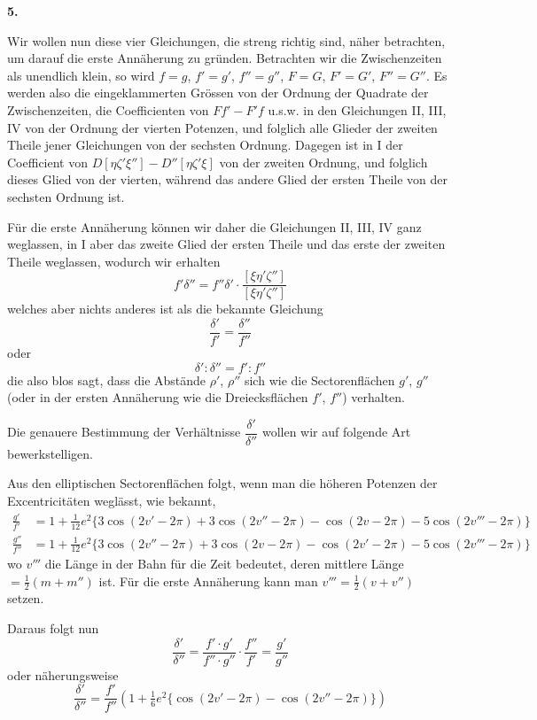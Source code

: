 \documentclass[10pt,a4paper]{article}
\begin{document}
\medskip
\noindent
\textbf{5.}

\medskip
\noindent
Wir wollen nun diese vier Gleichungen, die streng richtig sind, näher betrachten, um darauf die erste Annäherung zu gründen. Betrachten wir die Zwischenzeiten als unendlich klein, so wird $f = g$, $f' = g'$, $f'' = g''$, $F = G$, $F' = G'$, $F'' = G''$. Es werden also die eingeklammerten Grössen von der Ordnung der Quadrate der Zwischenzeiten, die Coefficienten von $Ff' - F'f$ u.s.w. in den Gleichungen II, III, IV von der Ordnung der vierten Potenzen, und folglich alle Glieder der zweiten Theile jener Gleichungen von der sechsten Ordnung. Dagegen ist in I der Coefficient von $D[\eta\zeta'\xi''] - D''[\eta\zeta'\xi]$ von der zweiten Ordnung, und folglich dieses Glied von der vierten, während das andere Glied der ersten Theile von der sechsten Ordnung ist.

Für die erste Annäherung können wir daher die Gleichungen II, III, IV ganz weglassen, in I aber das zweite Glied der ersten Theile und das erste der zweiten Theile weglassen, wodurch wir erhalten
\[
f'\delta'' = f''\delta' \cdot \frac{[\xi\eta'\zeta'']}{[\xi\eta'\zeta'']}
\]
welches aber nichts anderes ist als die bekannte Gleichung
\[
\frac{\delta'}{f'} = \frac{\delta''}{f''}
\]
oder
\[
\delta' : \delta'' = f' : f''
\]
die also blos sagt, dass die Abstände $\rho'$, $\rho''$ sich wie die Sectorenflächen $g'$, $g''$ (oder in der ersten Annäherung wie die Dreiecksflächen $f'$, $f''$) verhalten.

\clearpage
\noindent
Die genauere Bestimmung der Verhältnisse $\dfrac{\delta'}{\delta''}$ wollen wir auf folgende Art bewerkstelligen.

Aus den elliptischen Sectorenflächen folgt, wenn man die höheren Potenzen der Excentricitäten weglässt, wie bekannt,
\begin{align*}
\frac{g'}{f'} &= 1 + \tfrac{1}{12}e^2\{3\cos(2v' - 2\pi) + 3\cos(2v'' - 2\pi) - \cos(2v - 2\pi) - 5\cos(2v''' - 2\pi)\} \\
\frac{g''}{f''} &= 1 + \tfrac{1}{12}e^2\{3\cos(2v'' - 2\pi) + 3\cos(2v - 2\pi) - \cos(2v' - 2\pi) - 5\cos(2v''' - 2\pi)\}
\end{align*}
wo $v'''$ die Länge in der Bahn für die Zeit bedeutet, deren mittlere Länge $= \tfrac{1}{2}(m + m'')$ ist. Für die erste Annäherung kann man $v''' = \tfrac{1}{2}(v + v'')$ setzen.

Daraus folgt nun
\[
\frac{\delta'}{\delta''} = \frac{f' \cdot g'}{f'' \cdot g''} \cdot \frac{f''}{f'} = \frac{g'}{g''}
\]
oder näherungsweise
\[
\frac{\delta'}{\delta''} = \frac{f'}{f''}\left(1 + \tfrac{1}{6}e^2\{\cos(2v' - 2\pi) - \cos(2v'' - 2\pi)\}\right)
\]
\end{document}
